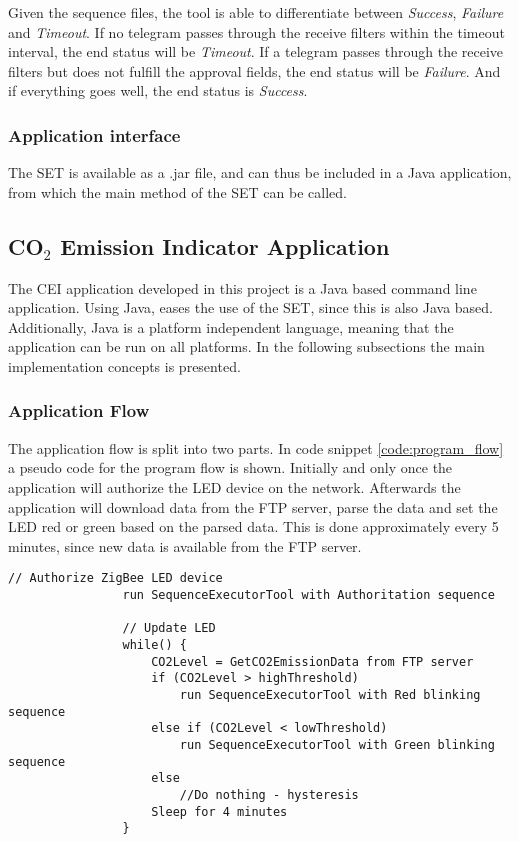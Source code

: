 \documentclass[Main]{subfiles}
\begin{document}
			Given the sequence files, the tool is able to differentiate between \emph{Success}, \emph{Failure} and \emph{Timeout}.
			If no telegram passes through the receive filters within the timeout interval, the end status will be \emph{Timeout}.
			If a telegram passes through the receive filters but does not fulfill the approval fields, the end status will be \emph{Failure}.
			And if everything goes well, the end status is \emph{Success}.

		\subsubsection{Application interface}
			The SET is available as a .jar file, and can thus be included in a Java application, from which the main method of the SET can be called.


	\subsection{CO$_2$ Emission Indicator Application}
		The CEI application developed in this project is a Java based command line application. 
		Using Java, eases the use of the SET, since this is also Java based. 
		Additionally, Java is a platform independent language, meaning that the application can be run on all platforms. 
		In the following subsections the main implementation concepts is presented.

		\subsubsection{Application Flow}
		\label{sub:application_flow}
			The application flow is split into two parts. 
			In code snippet \ref{code:program_flow} a pseudo code for the program flow is shown.
			Initially and only once the application will authorize the LED device on the network.
			Afterwards the application will download data from the FTP server, parse the data and set the LED red or green based on the parsed data.
			This is done approximately every 5 minutes, since new data is available from the FTP server.

			\begin{lstlisting}[caption=Program Flow, style=Code-C, label=code:program_flow]
				// Authorize ZigBee LED device
				run SequenceExecutorTool with Authoritation sequence

				// Update LED
				while() {
					CO2Level = GetCO2EmissionData from FTP server
					if (CO2Level > highThreshold)
						run SequenceExecutorTool with Red blinking sequence
					else if (CO2Level < lowThreshold)
						run SequenceExecutorTool with Green blinking sequence
					else
						//Do nothing - hysteresis
					Sleep for 4 minutes
				}
			\end{lstlisting}
\end{document}
